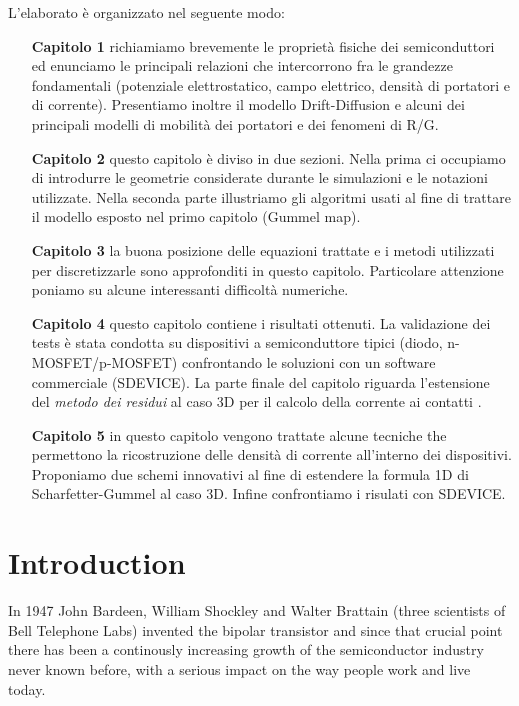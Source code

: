 L'elaborato \`e organizzato nel seguente modo:
\begin{itemize}[leftmargin=2.5cm]
\item[\bf Capitolo 1]  richiamiamo brevemente le propriet\`a fisiche dei semiconduttori ed enunciamo le principali relazioni che intercorrono fra le grandezze fondamentali (potenziale elettrostatico, campo elettrico, densit\`a di portatori e di corrente). Presentiamo inoltre il modello Drift-Diffusion e alcuni dei principali modelli di mobilit\`a dei portatori e dei fenomeni di R/G.

\item[\bf Capitolo 2] questo capitolo \`e diviso in due sezioni. Nella prima ci occupiamo di introdurre le geometrie considerate durante le simulazioni e le notazioni utilizzate. Nella seconda parte illustriamo gli algoritmi usati al fine di trattare il modello esposto nel primo capitolo (Gummel map).

\item[\bf Capitolo 3] la buona posizione delle equazioni trattate e i metodi utilizzati per discretizzarle sono approfonditi in questo capitolo. Particolare attenzione poniamo su alcune interessanti difficolt\`a numeriche.

\item[\bf Capitolo 4] questo capitolo contiene i risultati ottenuti. La validazione dei tests \`e stata condotta su dispositivi a semiconduttore tipici (diodo, n-MOSFET/p-MOSFET) confrontando le soluzioni con un software commerciale (SDEVICE). La parte finale del capitolo riguarda l'estensione del \textit{metodo dei residui} al caso 3D per il calcolo della corrente ai contatti \cite{ContactCurrentRM}.

\item[\bf Capitolo 5] in questo capitolo vengono trattate alcune tecniche the permettono la ricostruzione delle densit\`a di corrente all'interno dei dispositivi. Proponiamo due schemi innovativi al fine di  estendere la formula 1D di Scharfetter-Gummel \cite{Gummel:SignAnalys} al caso 3D. Infine confrontiamo i risulati con SDEVICE.
\end{itemize}


\chapter*{Introduction}

In 1947 John Bardeen, William Shockley and Walter Brattain (three scientists of Bell Telephone Labs) invented the bipolar transistor and since that crucial point there has been a continously increasing growth of the semiconductor industry never known before, with a serious impact on the way people work and live today. 

